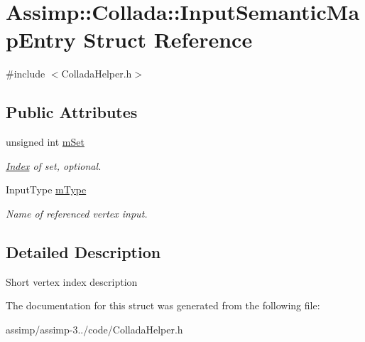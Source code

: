\hypertarget{struct_assimp_1_1_collada_1_1_input_semantic_map_entry}{\section{Assimp\+:\+:Collada\+:\+:Input\+Semantic\+Map\+Entry Struct Reference}
\label{struct_assimp_1_1_collada_1_1_input_semantic_map_entry}
}


{\ttfamily \#include $<$Collada\+Helper.\+h$>$}

\subsection*{Public Attributes}
\begin{DoxyCompactItemize}
\item 
\hypertarget{struct_assimp_1_1_collada_1_1_input_semantic_map_entry_af24acfa9c85e144b45457cda05cbc1e4}{unsigned int \hyperlink{struct_assimp_1_1_collada_1_1_input_semantic_map_entry_af24acfa9c85e144b45457cda05cbc1e4}{m\+Set}}\label{struct_assimp_1_1_collada_1_1_input_semantic_map_entry_af24acfa9c85e144b45457cda05cbc1e4}

\begin{DoxyCompactList}\small\item\em \hyperlink{struct_index}{Index} of set, optional. \end{DoxyCompactList}\item 
\hypertarget{struct_assimp_1_1_collada_1_1_input_semantic_map_entry_a031aca770949582e66184035e0974c78}{Input\+Type \hyperlink{struct_assimp_1_1_collada_1_1_input_semantic_map_entry_a031aca770949582e66184035e0974c78}{m\+Type}}\label{struct_assimp_1_1_collada_1_1_input_semantic_map_entry_a031aca770949582e66184035e0974c78}

\begin{DoxyCompactList}\small\item\em Name of referenced vertex input. \end{DoxyCompactList}\end{DoxyCompactItemize}


\subsection{Detailed Description}
Short vertex index description 

The documentation for this struct was generated from the following file\+:\begin{DoxyCompactItemize}
\item 
assimp/assimp-\/3../code/Collada\+Helper.\+h\end{DoxyCompactItemize}
